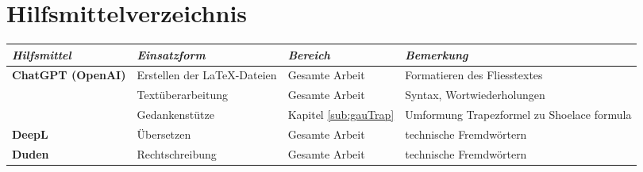 \chapter*{Hilfsmittelverzeichnis}
\label{cha:tools} %

\begingroup
\fontsize{12pt}{14pt}\selectfont

\newcommand{\tabTitle}[1]{\textbf{\textit{\large #1}}}
\renewcommand{\arraystretch}{1.5} %

\begin{table}[H]
    \centering
    \begin{tabularx}{\textwidth}{|l|X|X|X|}
        \hline
        \tabTitle{Hilfsmittel} & \tabTitle{Einsatzform} & \tabTitle{Bereich} & \tabTitle{Bemerkung} \\
        \hline

        \textbf{ChatGPT (OpenAI)} & Erstellen der LaTeX-Dateien & Gesamte Arbeit & Formatieren des Fliesstextes \\
         & Textüberarbeitung & Gesamte Arbeit & Syntax, Wortwiederholungen \\ 
         & Gedankenstütze & Kapitel \ref{sub:gauTrap} & Umformung Trapezformel zu Shoelace formula \cite{oai:chatgpt} \\
        \hline
        \textbf{DeepL} & Übersetzen & Gesamte Arbeit & technische Fremdwörtern \\
        \hline
        \textbf{Duden} & Rechtschreibung & Gesamte Arbeit & technische Fremdwörtern \\
        \hline
    \end{tabularx}
        \label{tab:tools}
\end{table}

\renewcommand{\arraystretch}{1.0}

\endgroup